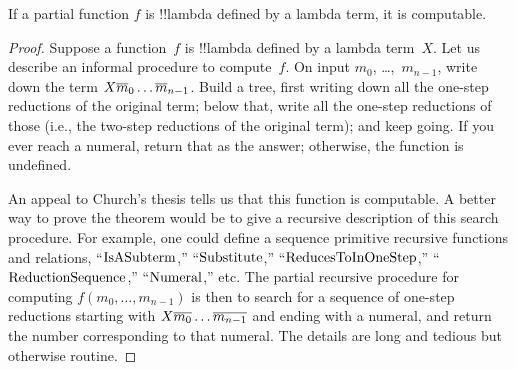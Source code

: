 \documentclass[../../../include/open-logic-section]{subfiles}
\begin{document}

\begin{thm}
If a partial function $f$ is !!{lambda defined} by a lambda term, it is
computable.
\end{thm}

\begin{proof}
Suppose a function~$f$ is !!{lambda defined} by a lambda term~$X$. Let us
describe an informal procedure to compute~$f$. On input $m_0$,
\dots,~$m_{n-1}$, write down the term $X \overline{m}_0 \ldots \overline{m}_{n-1}$. Build a tree, first writing down all the one-step reductions
of the original term; below that, write all the one-step reductions of
those (i.e., the two-step reductions of the original term); and keep
going. If you ever reach a numeral, return that as the answer;
otherwise, the function is undefined.

An appeal to Church's thesis tells us that this function is
computable. A better way to prove the theorem would be to give a
recursive description of this search procedure. For example, one
could define a sequence primitive recursive functions and relations,
``$\mathrm{IsASubterm}$,'' ``$\mathrm{Substitute}$,''
``$\mathrm{ReducesToInOneStep}$,'' ``$\mathrm{ReductionSequence}$,''
``$\mathrm{Numeral}$,'' etc. The partial recursive procedure for computing
$f(m_0, \dots, m_{n-1})$ is then to search for a sequence of one-step
reductions starting with $X \overline{m_0} \dots \overline{m_{n-1}}$ and ending
with a numeral, and return the number corresponding to that numeral.
The details are long and tedious but otherwise routine.
\end{proof}
\end{document}
